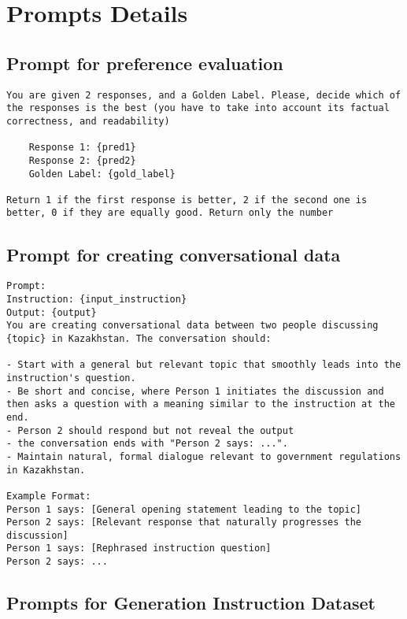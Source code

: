 \appendix

\section{Prompts Details}
\subsection{Prompt  for preference evaluation}
\label{sec:pref-eval}
\begin{lstlisting}[basicstyle=\ttfamily\scriptsize, breaklines=true]
You are given 2 responses, and a Golden Label. Please, decide which of the responses is the best (you have to take into account its factual correctness, and readability)

    Response 1: {pred1}
    Response 2: {pred2}
    Golden Label: {gold_label}

Return 1 if the first response is better, 2 if the second one is better, 0 if they are equally good. Return only the number
\end{lstlisting} 

\subsection{Prompt for creating conversational data }
\label{sec:pref-eval}
\begin{lstlisting}[basicstyle=\ttfamily\scriptsize, breaklines=true]
Prompt: 
Instruction: {input_instruction}
Output: {output}
You are creating conversational data between two people discussing {topic} in Kazakhstan. The conversation should:  

- Start with a general but relevant topic that smoothly leads into the instruction's question.  
- Be short and concise, where Person 1 initiates the discussion and then asks a question with a meaning similar to the instruction at the end.  
- Person 2 should respond but not reveal the output
- the conversation ends with "Person 2 says: ...".  
- Maintain natural, formal dialogue relevant to government regulations in Kazakhstan.  

Example Format:  
Person 1 says: [General opening statement leading to the topic]  
Person 2 says: [Relevant response that naturally progresses the discussion]  
Person 1 says: [Rephrased instruction question]  
Person 2 says: ...
\end{lstlisting} 


\subsection{Prompts for Generation Instruction Dataset}
\label{sec:prompts}

